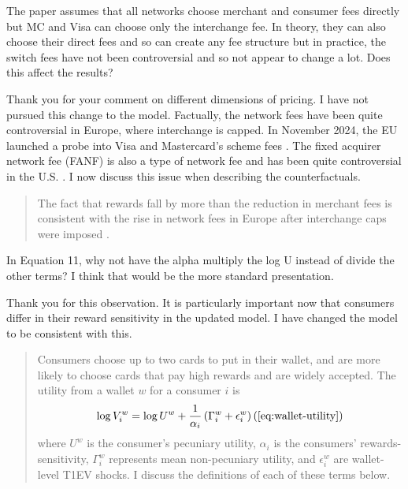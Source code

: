 \documentclass[main.tex]{subfiles}
\begin{document}
\begin{refsection}
\begin{refcomment}
The paper assumes that all networks choose merchant and consumer fees directly but MC and Visa can choose only the interchange fee.
In theory, they can also choose their direct fees and so can create any fee structure but in practice, the switch fees have not been controversial and so not appear to change a lot.
Does this affect the results?
\end{refcomment}

Thank you for your comment on different dimensions of pricing.
I have not pursued this change to the model.
Factually, the network fees have been quite controversial in Europe, where interchange is capped.
In November 2024, the EU launched a probe into Visa and Mastercard's scheme fees \parencite{PYMNTS2024}.
The fixed acquirer network fee (FANF) is also a type of network fee and has been quite controversial in the U.S. \parencite{Au-Yeung2024}.
I now discuss this issue when describing the counterfactuals.

\begin{quotation}
    The fact that rewards fall by more than the reduction in merchant fees is consistent with the rise in network fees in Europe after interchange caps were imposed \parencite{PYMNTS2024}.
\end{quotation}

\begin{refcomment}
In Equation 11, why not have the alpha multiply the log U instead of divide the other terms?
I think that would be the more standard presentation.
\end{refcomment}

Thank you for this observation.
It is particularly important now that consumers differ in their reward sensitivity in the updated model.
I have changed the model to be consistent with this.
\begin{quotation}
    Consumers choose up to two cards to put in their wallet, and are more likely to choose cards that pay high rewards and are widely accepted.
The utility from a wallet $w$ for a consumer $i$ is
    \begin{equation}
    \log V_{i}^{w}=\log U^w +\frac{1}{\alpha_{i}}\left(\Gamma_{i}^{w}+\epsilon_{i}^{w}\right) (\ref{eq:wallet-utility}) \nonumber
    \end{equation}
    where $U^w$ is the consumer's pecuniary utility, $\alpha_i$ is the consumers' rewards-sensitivity, $\Gamma_i^w$ represents mean non-pecuniary utility, and $\epsilon_i^w$ are wallet-level T1EV shocks.
I discuss the definitions of each of these terms below.
\end{quotation}


\end{refsection}
\end{document}
